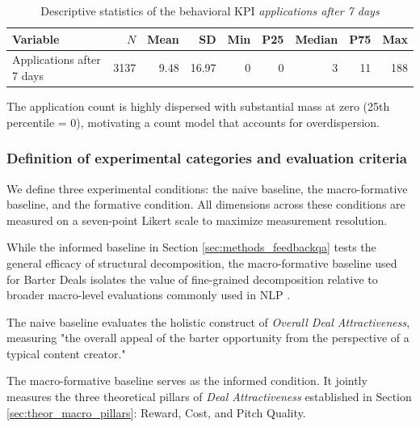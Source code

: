 \begin{table}[h]
    \centering
    \caption{Descriptive statistics of the behavioral KPI \textit{applications after 7 days}}
    \label{tab:apps7d_stats}
    \begin{tabular}{lrrrrrrrr}
    \toprule
    Variable & $N$ & Mean & SD & Min & P25 & Median & P75 & Max \\
    \midrule
    Applications after 7 days & 3137 & 9.48 & 16.97 & 0 & 0 & 3 & 11 & 188 \\
    \bottomrule
    \end{tabular}
\end{table}

The application count is highly dispersed with substantial mass at zero (25th percentile = 0), motivating a count model that accounts for overdispersion.


\subsubsection{Definition of experimental categories and evaluation criteria}

We define three experimental conditions: the naive baseline, the macro-formative baseline, and the formative condition. All dimensions across these conditions are measured on a seven-point Likert scale to maximize measurement resolution.

While the informed baseline in Section \ref{sec:methods_feedbackqa} tests the general efficacy of structural decomposition, the macro-formative baseline used for Barter Deals isolates the value of fine-grained decomposition relative to broader macro-level evaluations commonly used in NLP \citep{fabbri_summeval_2021, liu_g-eval_2023, zhong_towards_2022}.

The naive baseline evaluates the holistic construct of \textit{Overall Deal Attractiveness}, measuring "the overall appeal of the barter opportunity from the perspective of a typical content creator." 

The macro-formative baseline serves as the informed condition. It jointly measures the three theoretical pillars of \textit{Deal Attractiveness} established in Section \ref{sec:theor_macro_pillars}: Reward, Cost, and Pitch Quality. 

